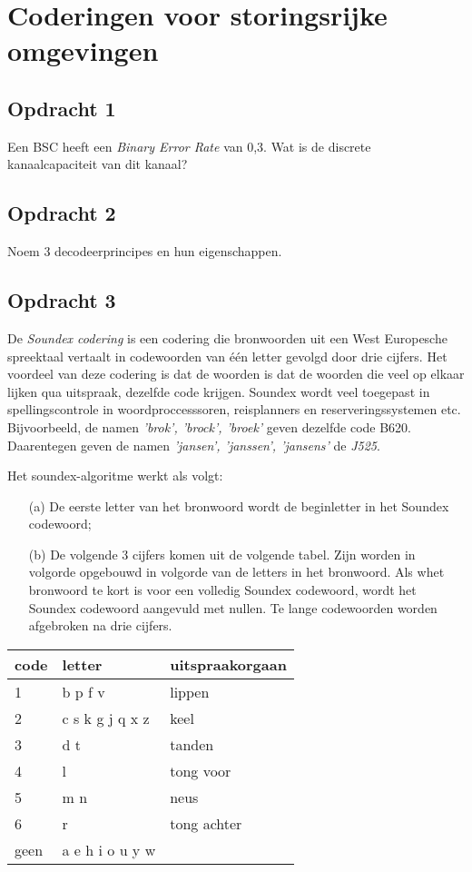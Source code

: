 \chapter{Coderingen voor storingsrijke omgevingen}

\section{Opdracht 1}
Een BSC heeft een \emph{Binary Error Rate} van 0,3. Wat is de discrete kanaalcapaciteit van dit kanaal?

\section{Opdracht 2}
Noem 3 decodeerprincipes en hun eigenschappen.

\section{Opdracht 3}
De \emph{Soundex codering} is een codering die bronwoorden uit een West Europesche spreektaal vertaalt in codewoorden van \'{e}\'{e}n letter gevolgd door drie cijfers. Het voordeel van deze codering is dat de woorden is dat de woorden die veel op elkaar lijken qua uitspraak, dezelfde code krijgen. Soundex wordt veel toegepast in spellingscontrole in woordproccesssoren, reisplanners en reserveringssystemen etc. Bijvoorbeeld, de namen \emph{'brok', 'brock', 'broek'} geven dezelfde code B620. Daarentegen geven de namen \emph{'jansen', 'janssen', 'jansens'} de \emph{J525}.

Het soundex-algoritme werkt als volgt:
\begin{itemize}
  \item[(a)]De eerste letter van het bronwoord wordt de beginletter in het Soundex codewoord;
  \item[(b)]De volgende 3 cijfers komen uit de volgende tabel. Zijn worden in volgorde opgebouwd in volgorde van de letters in het bronwoord. Als whet bronwoord te kort is voor een volledig Soundex codewoord, wordt het Soundex codewoord aangevuld met nullen. Te lange codewoorden worden afgebroken na drie cijfers.
\end{itemize}

\begin{tabular}{lll}
code & letter & uitspraakorgaan \\
\hline
1 & b p f v & lippen\\
2 & c s k g j q x z & keel\\
3 & d t & tanden\\
4 & l & tong voor\\
5 & m n & neus \\
6 & r & tong achter \\
geen & a e h i o u y w & \\
\end{tabular}


